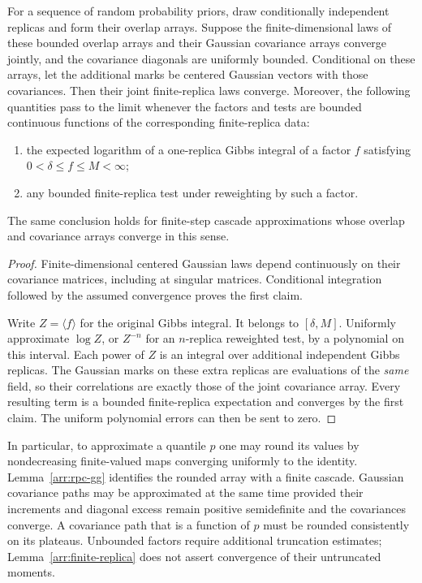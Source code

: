 \begin{lemma}\label{arr:finite-replica}
For a sequence of random probability priors, draw conditionally
independent replicas and form their overlap arrays. Suppose the
finite-dimensional laws of these bounded overlap arrays and
their Gaussian covariance arrays converge jointly, and the covariance
diagonals are uniformly bounded. Conditional on these arrays, let the
additional marks be centered Gaussian vectors with those covariances.
Then their joint finite-replica laws converge. Moreover, the following
quantities pass to the limit whenever the factors and tests are bounded
continuous functions of the corresponding finite-replica data:
\begin{enumerate}
 \item the expected logarithm of a one-replica Gibbs integral of a
 factor $f$ satisfying $0<\delta\leq f\leq M<\infty$;
 \item any bounded finite-replica test under reweighting by such a
 factor.
\end{enumerate}
The same conclusion holds for finite-step cascade approximations whose
overlap and covariance arrays converge in this sense.
\end{lemma}

\begin{proof}
Finite-dimensional centered Gaussian laws depend continuously on their
covariance matrices, including at singular matrices. Conditional
integration followed by the assumed convergence proves the first
claim.

Write $Z=\langle f\rangle$ for the original Gibbs integral. It belongs
to $[\delta,M]$. Uniformly approximate $\log Z$, or $Z^{-n}$ for an
$n$-replica reweighted test, by a polynomial on this interval. Each
power of $Z$ is an integral over additional independent Gibbs replicas.
The Gaussian marks on these extra replicas are evaluations of the
\emph{same} field, so their correlations are exactly those of the
joint covariance array. Every resulting term is a bounded
finite-replica expectation and converges by the first claim. The
uniform polynomial errors can then be sent to zero.
\end{proof}

In particular, to approximate a quantile $p$ one may round its values
by nondecreasing finite-valued maps converging uniformly to the
identity. Lemma~\ref{arr:rpc-gg} identifies the rounded array with a
finite cascade. Gaussian covariance paths may be approximated at the
same time provided their increments and diagonal excess remain
positive semidefinite and the covariances converge. A covariance path
that is a function of $p$ must be rounded consistently on its
plateaus. Unbounded factors require additional truncation estimates;
Lemma~\ref{arr:finite-replica} does not assert convergence of their
untruncated moments.

